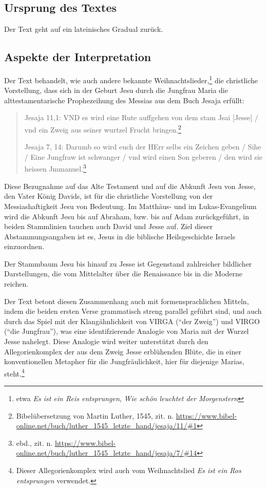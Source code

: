\documentclass[a4paper]{book}
\begin{document}
\begin{samepage}

\subsection{Ursprung des Textes}
Der Text geht auf ein lateinisches Gradual zurück. 


\subsection{Aspekte der Interpretation}

\begin{multicols}{2}

Der Text behandelt, wie auch andere bekannte Weihnachtslieder,\footnote{etwa \emph{Es ist ein Reis entsprungen}, \emph{Wie schön leuchtet der Morgenstern}} die christliche Vorstellung, dass sich in der Geburt Jesu durch die Jungfrau Maria die alttestamentarische Prophezeihung des Messias aus dem Buch Jesaja erfüllt: 

\begin{quote}
Jesaja 11,1: VND es wird eine Rute auffgehen von dem stam Jsai [Jesse] / vnd ein Zweig aus seiner wurtzel Frucht bringen.\footnote{Bibelübersetzung von Martin Luther, 1545, zit. n. \url{https://www.bibel-online.net/buch/luther_1545_letzte_hand/jesaja/11/\#1}}

Jesaja 7, 14: Darumb so wird euch der HErr selbs ein Zeichen geben / Sihe / Eine Jungfraw ist schwanger / vnd wird einen Son geberen / den wird sie heissen Jmmanuel.\footnote{ebd., zit. n. \url{https://www.bibel-online.net/buch/luther_1545_letzte_hand/jesaja/7/\#14}}
\end{quote}

Diese Bezugnahme auf das Alte Testament und auf die Abkunft Jesu von Jesse, den Vater König Davids, ist für die christliche Vorstellung von der Messiashaftigkeit Jesu von Bedeutung. Im Matthäus- und im Lukas-Evangelium wird die Abkunft Jesu bis auf Abraham, bzw. bis auf Adam zurückgeführt, in beiden Stammlinien tauchen auch David und Jesse auf. Ziel dieser Abstammungsangaben ist es, Jesus in die biblische Heilsgeschichte Israels einzuordnen. 

Der Stammbaum Jesu bis hinauf zu Jesse ist Gegenstand zahlreicher bildlicher Darstellungen, die vom Mittelalter über die Renaissance bis in die Moderne reichen.

Der Text betont diesen Zusammenhang auch mit formensprachlichen Mitteln, indem die beiden ersten Verse grammatisch streng parallel geführt sind, und auch durch das Spiel mit der Klangähnlichkeit von VIRGA (\enquote{der Zweig}) und VIRGO (\enquote{die Jungfrau}), was eine identifzierende Analogie von Maria mit der Wurzel Jesse nahelegt. Diese Analogie wird weiter unterstützt durch den Allegorienkomplex der aus dem Zweig Jesse erblühenden Blüte, die in einer konventionellen Metapher für die Jungfräulichkeit, hier für diejenige Marias, steht.\footnote{Dieser Allegorienkomplex wird auch vom Weihnachtslied \emph{Es ist ein Ros entsprungen} verwendet.}


\end{multicols}
\end{samepage}
\end{document}
